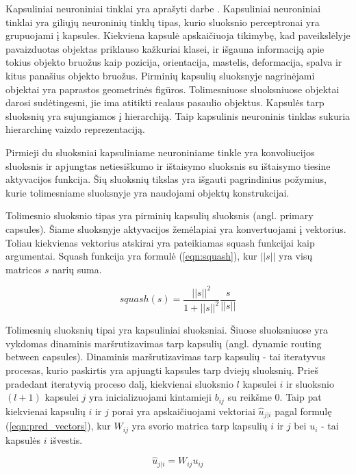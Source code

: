 Kapsuliniai neuroniniai tinklai yra aprašyti darbe \cite{capsNet}. Kapsuliniai neuroniniai tinklai yra giliųjų neuroninių tinklų tipas, kurio sluoksnio perceptronai yra grupuojami į kapsules. Kiekviena kapsulė apskaičiuoja tikimybę, kad paveikslėlyje pavaizduotas objektas priklauso kažkuriai klasei, ir išgauna informaciją apie tokius objekto bruožus kaip pozicija, orientacija, mastelis, deformacija, spalva ir kitus panašius objekto bruožus. Pirminių kapsulių sluoksnyje nagrinėjami objektai yra paprastos geometrinės figūros. Tolimesniuose sluoksniuose objektai darosi sudėtingesni, jie ima atitikti realaus pasaulio objektus. Kapsulės tarp sluoksnių yra sujungiamos į hierarchiją. Taip kapsulinis neuroninis tinklas sukuria hierarchinę vaizdo reprezentaciją.

Pirmieji du sluoksniai kapsuliniame neuroniniame tinkle yra konvoliucijos sluoksnis ir apjungtas netiesiškumo ir ištaisymo sluoksnis su ištaisymo tiesine aktyvacijos funkcija. Šių sluoksnių tikslas yra išgauti pagrindinius požymius, kurie tolimesniame sluoksnyje yra naudojami objektų konstrukcijai.

Tolimesnio sluoksnio tipas yra pirminių kapsulių sluoksnis (angl. primary capsules). Šiame sluoksnyje aktyvacijos žemėlapiai yra konvertuojami į vektorius. Toliau kiekvienas vektorius atskirai yra pateikiamas squash funkcijai kaip argumentai. Squash funkcija yra formulė (\ref{eqn:squash}), kur $||s||$ yra visų matricos $s$ narių suma.

\begin{equation}
\label{eqn:squash}
	squash(s) = \dfrac{||s||^2}{1 + ||s||^2}\dfrac{s}{||s||}
\end{equation}

Tolimesnių sluoksnių tipai yra kapsuliniai sluoksniai. Šiuose sluoksniuose yra vykdomas dinaminis maršrutizavimas tarp kapsulių (angl. dynamic routing between capsules). Dinaminis maršrutizavimas tarp kapsulių - tai iteratyvus procesas, kurio paskirtis yra apjungti kapsules tarp dviejų sluoksnių. Prieš pradedant iteratyvią proceso dalį, kiekvienai sluoksnio $l$ kapsulei $i$ ir sluoksnio $(l + 1)$ kapsulei $j$ yra inicializuojami kintamieji $b_{ij}$ su reikšme 0. Taip pat kiekvienai kapsulių $i$ ir $j$ porai yra apskaičiuojami vektoriai $\hat{u}_{j|i}$ pagal formulę (\ref{eqn:pred_vectors}), kur $W_{ij}$ yra svorio matrica tarp kapsulių $i$ ir $j$ bei $u_{i}$ - tai kapsulės $i$ išvestis.

\begin{equation}
\label{eqn:pred_vectors}
	\hat{u}_{j|i} = W_{ij} u_{ij}
\end{equation}

